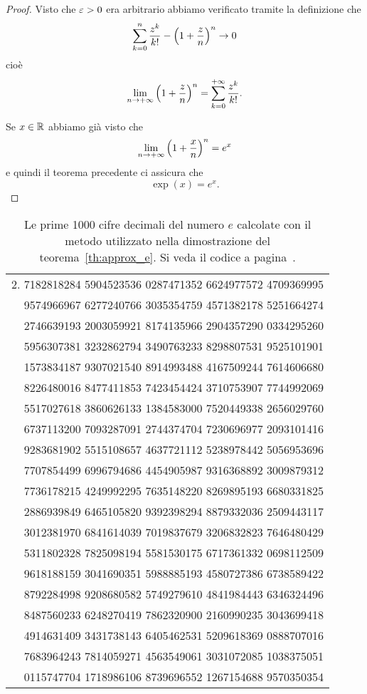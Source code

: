 \begin{proof}
Visto che $\varepsilon>0$ era arbitrario abbiamo verificato
tramite la definizione che
\[
\sum_{k=0}^n \frac{z^k}{k!} - {\left( 1+\frac z n \right)}^n \to 0
\]
cioè
\[
\lim_{n\to +\infty} {\left( 1+\frac z n \right)}^n = \sum_{k=0}^{+\infty} \frac{z^k}{k!}.
\]

Se $x\in \mathbb R$ abbiamo già visto che
\[
  \lim_{n\to +\infty}{\left( 1+\frac x n \right)}^n = e^x
\]
e quindi il teorema precedente ci assicura che
\[
  \exp(x) = e^x.
\]
\end{proof}

\begin{table}
\begin{center}
\begin{tabular}{r}
2.\small
  7182818284 5904523536 0287471352 6624977572 4709369995 \\ \small
  9574966967 6277240766 3035354759 4571382178 5251664274 \\ \small
  2746639193 2003059921 8174135966 2904357290 0334295260 \\ \small
  5956307381 3232862794 3490763233 8298807531 9525101901 \\ \small
  1573834187 9307021540 8914993488 4167509244 7614606680 \\ \small
  8226480016 8477411853 7423454424 3710753907 7744992069 \\ \small
  5517027618 3860626133 1384583000 7520449338 2656029760 \\ \small
  6737113200 7093287091 2744374704 7230696977 2093101416 \\ \small
  9283681902 5515108657 4637721112 5238978442 5056953696 \\ \small
  7707854499 6996794686 4454905987 9316368892 3009879312 \\ \small
  7736178215 4249992295 7635148220 8269895193 6680331825 \\ \small
  2886939849 6465105820 9392398294 8879332036 2509443117 \\ \small
  3012381970 6841614039 7019837679 3206832823 7646480429 \\ \small
  5311802328 7825098194 5581530175 6717361332 0698112509 \\ \small
  9618188159 3041690351 5988885193 4580727386 6738589422 \\ \small
  8792284998 9208680582 5749279610 4841984443 6346324496 \\ \small
  8487560233 6248270419 7862320900 2160990235 3043699418 \\ \small
  4914631409 3431738143 6405462531 5209618369 0888707016 \\ \small
  7683964243 7814059271 4563549061 3031072085 1038375051 \\ \small
  0115747704 1718986106 8739696552 1267154688 9570350354
\end{tabular}
\end{center}
\caption{Le prime 1000 cifre decimali del numero $e$
calcolate con il metodo utilizzato nella dimostrazione
del teorema~\ref{th:approx_e}.
Si veda il codice a pagina~\pageref{code:compute_e}.}
\label{fig:cifre_e}
\end{table}

